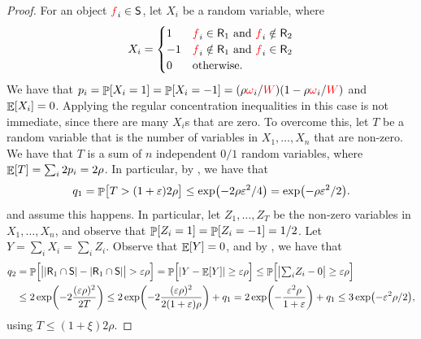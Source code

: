 \begin{proof}
    For an object ${\textcolor{red}{f}}_i \in \mathsf{S}$, let $X_i$ be a random 
    variable, where
    \begin{equation*}
        X_i = \begin{cases}
            1 & {\textcolor{red}{f}}_i \in \mathsf{R}_1 \text{ and } {\textcolor{red}{f}}_i \notin
            \mathsf{R}_2\\
            -1 & {\textcolor{red}{f}}_i \notin \mathsf{R}_1 \text{ and } {\textcolor{red}{f}}_i \in
            \mathsf{R}_2\\
            0 & \text{otherwise.}
        \end{cases}
    \end{equation*}
    We have that
    $p_i = \Prob{X_i = 1} = \Prob{X_i=-1} = (\rho \Wg_i / \TotalW)( 1-
    \rho \Wg_i / \TotalW)$ and $\mathop{\mathbb{E}}\!\left[ {X_i} \right] = 0$. Applying the regular
    concentration inequalities in this case is not immediate, since
    there are many $X_i$s that are zero. To overcome this, let $T$ be
    a random variable that is the number of variables in
    $X_1, \ldots, X_n$ that are non-zero. We have that $T$ is a sum of
    $n$ independent $0/1$ random variables, where
    $\mathop{\mathbb{E}}\!\left[ {T} \right] = \sum_i 2p_i =2 \rho$. In particular, by
    , we have
    that
    \begin{equation*}
        q_1 = \Prob{\bigl. T  > (1+\eps) 2 \rho}%
        \leq%
        \exp\pth{ \bigl.- 2\rho\eps^2 /4}
        =%
        \exp\pth{ \bigl.- \rho\eps^2 /2}.
    \end{equation*}
    and assume this happens.  In particular, let $Z_1, \ldots, Z_T$ be
    the non-zero variables in $X_1,\ldots, X_n$, and observe that
    $\Prob{Z_i=1} = \Prob{Z_i=-1} = 1/2$.  Let
    $Y=\sum_i X_i = \sum_i Z_i$. Observe that $\mathop{\mathbb{E}}\!\left[ {Y} \right] = 0$, and by
    , we have that
    \begin{align*}
      q_2%
      &=%
        \Prob{\Bigl.
        \cardin{\bigl.\cardin{\Sample_1 \cap \ObjSet} - \cardin{\Sample_1
        \cap \ObjSet} }%
        > %
        \eps \rho
        }
        =%
        \Prob{\Bigl. \cardin{Y - \Ex{Y}} \geq \eps \rho}
        \leq%
        \Prob{\Bigl. \cardin{\bigl.\textstyle{\sum}_i Z_i - 0} \geq
        \eps \rho}
      \\%
      &
        \leq%
        2 \exp\pth{ - 2 \frac{ (\eps \rho)^2 }{2T}}
        \leq%
        2 \exp\pth{ - 2 \frac{ (\eps \rho)^2 }{2(1+\eps)\rho}} + q_1
        =%
        2 \exp\pth{ -  \frac{ \eps^2 \rho }{1+\eps}} + q_1
        \leq%
        3 \exp\pth{ -   \eps^2 \rho/2 },
    \end{align*}
    using $T \leq (1+\xi)2\rho$.
\end{proof}



